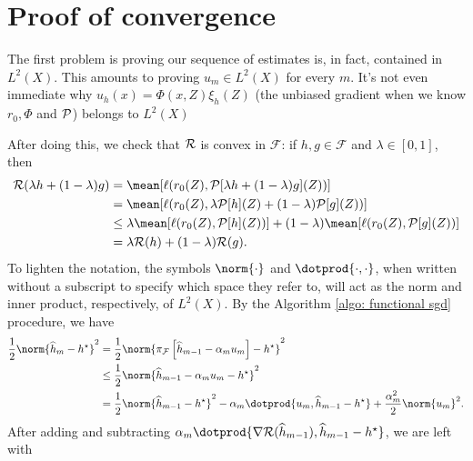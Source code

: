 \section{Proof of convergence}

The first problem is proving our sequence of estimates is, in fact, contained in $ L^{ 2 } ( X ) $.
This amounts to proving $ u_{ m } \in L^{ 2 } ( X ) $ for every $ m $.
It's not even immediate why $ u_{ h } ( x ) = \Phi ( x, Z ) \xi_{ h } ( Z ) $ (the unbiased gradient when we know $ r_{ 0 }, \Phi $ and $ \mathcal{P} $) belongs to $ L^{ 2 } ( X ) $

After doing this, we check that $ \mathcal{R} $ is convex in $ \mathcal{F} $:
if $ h, g \in \mathcal{F} $ and $ \lambda \in [ 0, 1 ] $, then
\begin{align*}
    \risk ( \lambda h + ( 1 - \lambda ) g )
    &= \mean [ \loss ( r_{ 0 } ( Z ), \meanop [ \lambda h + ( 1 - \lambda ) g ] ( Z ) ) ] \\
    &= \mean [ \loss ( r_{ 0 } ( Z ), \lambda \meanop [ h ] ( Z ) + ( 1 - \lambda ) \meanop [ g ] ( Z ) ) ] \\
    &\leq \lambda \mean [ \loss ( r_{ 0 } ( Z ), \meanop [ h ] ( Z ) ) ] + ( 1 - \lambda ) \mean [ \loss ( r_{ 0 } ( Z ), \meanop [ g ] ( Z ) ) ] \\
    &= \lambda \risk ( h ) + ( 1 - \lambda ) \risk ( g )
.\end{align*}
To lighten the notation, the symbols $ \norm{ \cdot } $ and $ \dotprod{ \cdot, \cdot } $, when written without a subscript to specify which space they refer to, will act as the norm and inner product, respectively, of $ L^2 ( X ) $.
By the Algorithm \ref{algo: functional sgd} procedure, we have
\begin{align*}
    \frac{ 1 }{ 2 } \norm{ \hat{ h }_{ m } - \hstar }^2
    &= \frac{ 1 }{ 2 } \norm{ \pi_{ \mathcal{F} } \left[ \hat{ h }_{ m-1 } - \alpha_{ m } u_{ m } \right] - \hstar }^2 \\
    &\leq \frac{ 1 }{ 2 } \norm{ \hat{ h }_{ m-1 } - \alpha_{ m } u_{ m } - \hstar }^2 \\
    &= \frac{ 1 }{ 2 } \norm{ \hat{ h }_{ m-1 } - \hstar }^2
    - \alpha_{ m } \dotprod{ u_{ m }, \hat{ h }_{ m-1 } - \hstar }
    + \frac{ \alpha_{ m }^2 }{ 2 } \norm{ u_{ m } }^2
.\end{align*}
After adding and subtracting $ \alpha_{ m } \dotprod{ \nabla \risk ( \hat{ h }_{ m-1 } ), \hat{ h }_{ m-1 } - \hstar } $, we are left with
